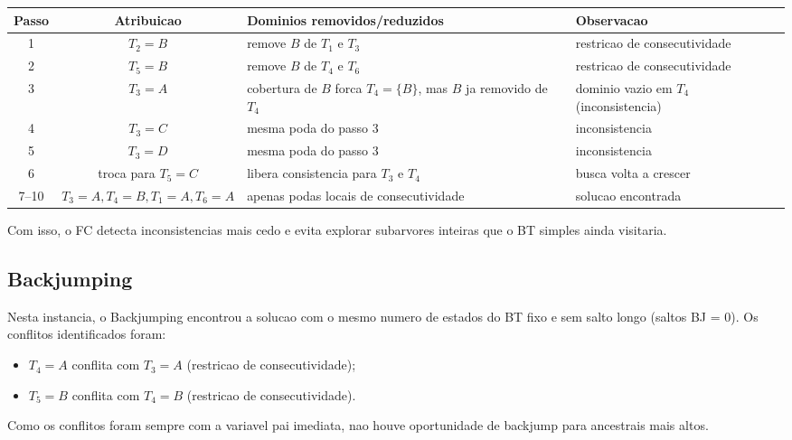 \begingroup
\footnotesize
\setlength{\tabcolsep}{3pt}
\renewcommand{\arraystretch}{1.08}
\begin{longtable}{c c >{\raggedright\arraybackslash}p{5.25cm} >{\raggedright\arraybackslash}p{2.65cm}}
\toprule
Passo & Atribuicao & Dominios removidos/reduzidos & Observacao \\
\midrule
1 & $T_2=B$ & remove $B$ de $T_1$ e $T_3$ & restricao de consecutividade \\
2 & $T_5=B$ & remove $B$ de $T_4$ e $T_6$ & restricao de consecutividade \\
3 & $T_3=A$ & cobertura de $B$ forca $T_4=\{B\}$, mas $B$ ja removido de $T_4$ & dominio vazio em $T_4$ (inconsistencia) \\
4 & $T_3=C$ & mesma poda do passo 3 & inconsistencia \\
5 & $T_3=D$ & mesma poda do passo 3 & inconsistencia \\
6 & troca para $T_5=C$ & libera consistencia para $T_3$ e $T_4$ & busca volta a crescer \\
7--10 & $T_3=A,T_4=B,T_1=A,T_6=A$ & apenas podas locais de consecutividade & solucao encontrada \\
\bottomrule
\end{longtable}
\endgroup

Com isso, o FC detecta inconsistencias mais cedo e evita explorar subarvores inteiras que o BT simples ainda visitaria.

\subsection{Backjumping}
Nesta instancia, o Backjumping encontrou a solucao com o mesmo numero de estados do BT fixo e sem salto longo (saltos BJ = 0). Os conflitos identificados foram:
\begin{itemize}[leftmargin=1.5em]
  \item $T_4=A$ conflita com $T_3=A$ (restricao de consecutividade);
  \item $T_5=B$ conflita com $T_4=B$ (restricao de consecutividade).
\end{itemize}
Como os conflitos foram sempre com a variavel pai imediata, nao houve oportunidade de backjump para ancestrais mais altos.

